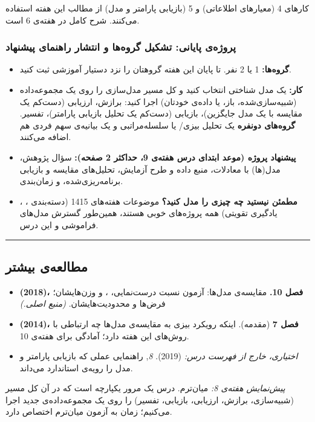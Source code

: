 کارهای 4 (معیارهای اطلاعاتی) و 5 (بازیابی پارامتر و مدل)  از
مطالب این هفته استفاده می‌کنند. شرح کامل در هفته‌ی 6 است.

\subsubsection{پروژه‌ی پایانی: تشکیل گروه‌ها و انتشار راهنمای پیشنهاد}

\begin{itemize}
\tightlist
\item
  \textbf{گروه‌ها:} 1 یا 2 نفر. تا پایان این هفته گروهتان را نزد دستیار
  آموزشی ثبت کنید.
\item
  \textbf{کار:} یک مدل شناختی انتخاب کنید و کل مسیر مدل‌سازی را روی یک
  مجموعه‌داده (شبیه‌سازی‌شده، باز، یا داده‌ی خودتان) اجرا کنید: برازش،
  ارزیابی (دست‌کم یک مقایسه با یک مدل جایگزین)، بازیابی (دست‌کم یک تحلیل
  بازیابی پارامتر)، تفسیر. \textbf{گروه‌های دونفره} یک تحلیل
  بیزی/ یا سلسله‌مراتبی و یک بیانیه‌ی سهم فردی هم اضافه می‌کنند.
\item
  \textbf{پیشنهاد پروژه (موعد ابتدای درس هفته‌ی 9، حداکثر 2 صفحه):} سؤال
  پژوهش، مدل(ها) با معادلات، منبع داده و طرح آزمایش، تحلیل‌های مقایسه و
  بازیابی برنامه‌ریزی‌شده، و زمان‌بندی.
\item
  \textbf{مطمئن نیستید چه چیزی را مدل کنید؟} موضوعات هفته‌های 14\lr{--}15
  (دسته‌بندی ، ، یادگیری تقویتی) همه
  پروژه‌های خوبی هستند، همین‌طور گسترش مدل‌های فراموشی و  این درس.
\end{itemize}

\begin{center}\rule{0.5\linewidth}{0.5pt}\end{center}

\subsection{مطالعه‌ی بیشتر}

\begin{itemize}
\tightlist
\item
  \textbf{ \lr{\&}  (2018)، فصل 10.} مقایسه‌ی
  مدل‌ها: آزمون نسبت درست‌نمایی، ،  و وزن‌هایشان؛ فرض‌ها و
  محدودیت‌هایشان. \emph{(منبع اصلی.)}
\item
  \textbf{ \lr{\&}  (2014)، فصل 7} (مقدمه). اینکه
  رویکرد بیزی به مقایسه‌ی مدل‌ها چه ارتباطی با روش‌های این هفته دارد؛
  آمادگی برای هفته‌ی 10.
\item
  \emph{اختیاری، خارج از فهرست درس:}  \lr{\&}  (2019).  \emph{ 8},  راهنمایی عملی
  که بازیابی پارامتر و مدل را رویه‌ی استاندارد می‌داند.
\end{itemize}

\emph{پیش‌نمایش هفته‌ی 8:} میان‌ترم. درس یک مرور یکپارچه است که در آن کل
مسیر (شبیه‌سازی، برازش، ارزیابی، بازیابی، تفسیر) را روی یک مجموعه‌داده‌ی
جدید اجرا می‌کنیم؛ زمان  به آزمون میان‌ترم اختصاص دارد.
